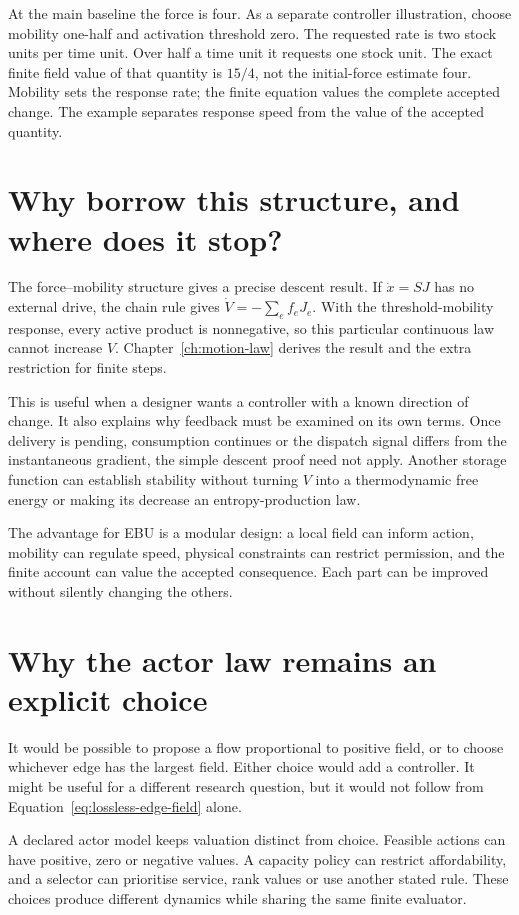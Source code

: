 At the main baseline the force is four. As a separate controller illustration,
choose mobility one-half and activation threshold zero. The requested rate
is two stock units per time unit. Over half a time unit it requests one
stock unit. The exact finite field value of that quantity is \(15/4\), not
the initial-force estimate four. Mobility sets the response rate; the finite
equation values the complete accepted change. The example separates response speed from the value of the accepted quantity.

\section{Why borrow this structure, and where does it stop?}
The force--mobility structure gives a precise descent result. If $\dot x=SJ$ has no external drive, the chain rule gives $\dot V=-\sum_e f_eJ_e$. With the threshold-mobility response, every active product is nonnegative, so this particular continuous law cannot increase $V$. Chapter~\ref{ch:motion-law} derives the result and the extra restriction for finite steps.

This is useful when a designer wants a controller with a known direction of change. It also explains why feedback must be examined on its own terms. Once delivery is pending, consumption continues or the dispatch signal differs from the instantaneous gradient, the simple descent proof need not apply. Another storage function can establish stability without turning $V$ into a thermodynamic free energy or making its decrease an entropy-production law.

The advantage for EBU is a modular design: a local field can inform action, mobility can regulate speed, physical constraints can restrict permission, and the finite account can value the accepted consequence. Each part can be improved without silently changing the others.

\section{Why the actor law remains an explicit choice}
It would be possible to propose a flow proportional to positive field, or to choose whichever edge has the largest field. Either choice would add a controller. It might be useful for a different research question, but it would not follow from Equation~\ref{eq:lossless-edge-field} alone.

A declared actor model keeps valuation distinct from choice. Feasible actions can have positive, zero or negative values. A capacity policy can restrict affordability, and a selector can prioritise service, rank values or use another stated rule. These choices produce different dynamics while sharing the same finite evaluator.

